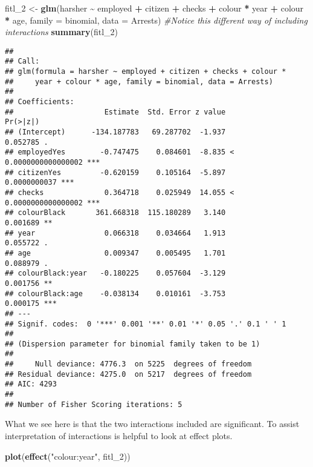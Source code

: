 \documentclass[
]{book}
\newenvironment{Shaded}{\begin{snugshade}}{\end{snugshade}}
\newcommand{\AttributeTok}[1]{\textcolor[rgb]{0.13,0.29,0.53}{#1}}
\newcommand{\CommentTok}[1]{\textcolor[rgb]{0.56,0.35,0.01}{\textit{#1}}}
\newcommand{\FunctionTok}[1]{\textcolor[rgb]{0.13,0.29,0.53}{\textbf{#1}}}
\newcommand{\NormalTok}[1]{#1}
\newcommand{\OtherTok}[1]{\textcolor[rgb]{0.56,0.35,0.01}{#1}}
\newcommand{\SpecialCharTok}[1]{\textcolor[rgb]{0.81,0.36,0.00}{\textbf{#1}}}
\newcommand{\StringTok}[1]{\textcolor[rgb]{0.31,0.60,0.02}{#1}}
\begin{document}
\begin{Shaded}
\begin{Highlighting}[]
\NormalTok{fitl\_2 }\OtherTok{\textless{}{-}} \FunctionTok{glm}\NormalTok{(harsher }\SpecialCharTok{\textasciitilde{}}\NormalTok{ employed }\SpecialCharTok{+}\NormalTok{ citizen }\SpecialCharTok{+}\NormalTok{ checks }\SpecialCharTok{+}\NormalTok{ colour }\SpecialCharTok{*}\NormalTok{ year }\SpecialCharTok{+}\NormalTok{ colour }\SpecialCharTok{*}\NormalTok{ age, }\AttributeTok{family =}\NormalTok{ binomial, }\AttributeTok{data =}\NormalTok{ Arrests) }\CommentTok{\#Notice this different way of including interactions}
\FunctionTok{summary}\NormalTok{(fitl\_2)}
\end{Highlighting}
\end{Shaded}

\begin{verbatim}
## 
## Call:
## glm(formula = harsher ~ employed + citizen + checks + colour * 
##     year + colour * age, family = binomial, data = Arrests)
## 
## Coefficients:
##                     Estimate  Std. Error z value             Pr(>|z|)    
## (Intercept)      -134.187783   69.287702  -1.937             0.052785 .  
## employedYes        -0.747475    0.084601  -8.835 < 0.0000000000000002 ***
## citizenYes         -0.620159    0.105164  -5.897         0.0000000037 ***
## checks              0.364718    0.025949  14.055 < 0.0000000000000002 ***
## colourBlack       361.668318  115.180289   3.140             0.001689 ** 
## year                0.066318    0.034664   1.913             0.055722 .  
## age                 0.009347    0.005495   1.701             0.088979 .  
## colourBlack:year   -0.180225    0.057604  -3.129             0.001756 ** 
## colourBlack:age    -0.038134    0.010161  -3.753             0.000175 ***
## ---
## Signif. codes:  0 '***' 0.001 '**' 0.01 '*' 0.05 '.' 0.1 ' ' 1
## 
## (Dispersion parameter for binomial family taken to be 1)
## 
##     Null deviance: 4776.3  on 5225  degrees of freedom
## Residual deviance: 4275.0  on 5217  degrees of freedom
## AIC: 4293
## 
## Number of Fisher Scoring iterations: 5
\end{verbatim}

What we see here is that the two interactions included are significant. To assist interpretation of interactions is helpful to look at effect plots.

\begin{Shaded}
\begin{Highlighting}[]
\FunctionTok{plot}\NormalTok{(}\FunctionTok{effect}\NormalTok{(}\StringTok{"colour:year"}\NormalTok{, fitl\_2))}
\end{Highlighting}
\end{Shaded}
\end{document}
